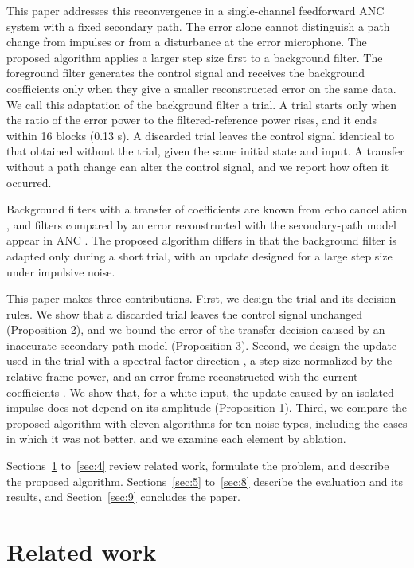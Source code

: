 \documentclass[sip,biber]{now-journal}
\begin{document}
This paper addresses this reconvergence in a single-channel feedforward ANC system with a fixed secondary path. The error alone cannot distinguish a path change from impulses or from a disturbance at the error microphone. The proposed algorithm applies a larger step size first to a background filter. The foreground filter generates the control signal and receives the background coefficients only when they give a smaller reconstructed error on the same data. We call this adaptation of the background filter a trial. A trial starts only when the ratio of the error power to the filtered-reference power rises, and it ends within 16 blocks (0.13 s). A discarded trial leaves the control signal identical to that obtained without the trial, given the same initial state and input. A transfer without a path change can alter the control signal, and we report how often it occurred.

Background filters with a transfer of coefficients are known from echo cancellation \cite{ochiai1977}, and filters compared by an error reconstructed with the secondary-path model appear in ANC \cite{harman2022,yin2023}. The proposed algorithm differs in that the background filter is adapted only during a short trial, with an update designed for a large step size under impulsive noise.

This paper makes three contributions. First, we design the trial and its decision rules. We show that a discarded trial leaves the control signal unchanged (Proposition 2), and we bound the error of the transfer decision caused by an inaccurate secondary-path model (Proposition 3). Second, we design the update used in the trial with a spectral-factor direction \cite{elliott2000}, a step size normalized by the relative frame power, and an error frame reconstructed with the current coefficients \cite{bjarnason1992}. We show that, for a white input, the update caused by an isolated impulse does not depend on its amplitude (Proposition 1). Third, we compare the proposed algorithm with eleven algorithms for ten noise types, including the cases in which it was not better, and we examine each element by ablation.

Sections~\ref{sec:2} to~\ref{sec:4} review related work, formulate the problem, and describe the proposed algorithm. Sections~\ref{sec:5} to~\ref{sec:8} describe the evaluation and its results, and Section~\ref{sec:9} concludes the paper.

\hypertarget{sec:2}{%
\section{Related work}\label{sec:2}}
\end{document}
